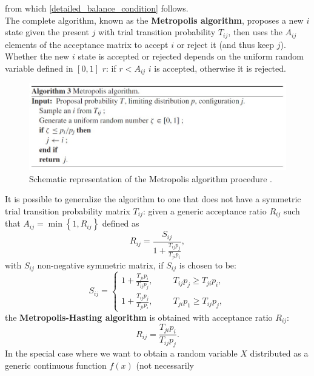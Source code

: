 from which \ref{detailed_balance_condition} follows.\\
The complete algorithm, known as the \textbf{Metropolis algorithm}, proposes a new $i$ state given the present $j$ with trial transition 
probability $T_{ij}$, then uses the $A_{ij}$ elements of the acceptance matrix to accept $i$ or reject it (and thus keep $j$). Whether the new $i$ state 
is accepted or rejected depends on the uniform random variable defined in $[0,1]$ $r$: if $r<A_{ij}$ $i$ is accepted, otherwise it 
is rejected.
\begin{figure}[H]
    \centering
    \includegraphics[scale=0.8]{Metropolis_algo.jpg}
    \caption{Schematic representation of the Metropolis algorithm procedure \cite{gubernatis2016quantum}.}
    \label{fig:Metropolis}
\end{figure}
It is possible to generalize the algorithm to one that does not have a symmetric trial transition probability matrix $T_{ij}$:
given a generic acceptance ratio $R_{ij}$ such that $A_{ij}=\min\left\{1,R_{ij}\right\}$ defined as
\begin{equation}
    R_{ij}=\frac{S_{ij}}{1+\frac{T_{ij}p_j}{T_{ji}p_i}},
\end{equation}
with $S_{ij}$ non-negative symmetric matrix, if $S_{ij}$ is chosen to be:
\begin{equation}
    S_{ij}=
    \begin{cases}
        1+\frac{T_{ji}p_i}{T_{ij}p_j},\hspace{1cm}T_{ij}p_j\ge T_{ji}p_i,\\
        1+\frac{T_{ij}p_j}{T_{ji}p_i},\hspace{1cm}T_{ji}p_1\ge T_{ij}p_j,
    \end{cases}
\end{equation}
the \textbf{Metropolis-Hasting algorithm} is obtained with acceptance ratio $R_{ij}$:
\begin{equation}
    R_{ij}=\frac{T_{ji}p_i}{T_{ij}p_j}.
    \label{metropolis-hastings_discrete}
\end{equation}
In the special case where we want to obtain a random variable $X$ distributed as a generic continuous function $f(x)$ (not necessarily 
